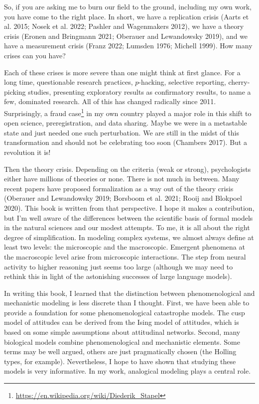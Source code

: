 \documentclass[
  a4paper,
  DIV=11,
  numbers=noendperiod,
  oneside]{scrreprt}
\let\oldmarginnote\marginnote
\renewcommand{\marginnote}[1]{%
\oldmarginnote{\setstretch{0.8}\selectfont#1}%
}
\begin{document}
So, if you are asking me to burn our field to the ground, including my
own work, you have come to the right place. In short, we have a
replication crisis (Aarts et al. 2015; Nosek et al. 2022; Pashler and
Wagenmakers 2012), we have a theory crisis (Eronen and Bringmann 2021;
Oberauer and Lewandowsky 2019), and we have a measurement crisis (Franz
2022; Lumsden 1976; Michell 1999). How many crises can you have?

Each of these crises is more severe than one might think at first
glance. {\marginnote{\begin{footnotesize}We can be most optimistic about
the replication crisis.\end{footnotesize}}} For a long time,
questionable research practices, \(p\)-hacking, selective reporting,
cherry-picking studies, presenting exploratory results as confirmatory
results, to name a few, dominated research. All of this has changed
radically since 2011. Surprisingly, a fraud case\footnote{\url{https://en.wikipedia.org/wiki/Diederik_Stapel}}
in my own country played a major role in this shift to open science,
preregistration, and data sharing. Maybe we were in a metastable state
and just needed one such perturbation. We are still in the midst of this
transformation and should not be celebrating too soon (Chambers 2017).
But a revolution it is!

Then the theory crisis. Depending on the criteria (weak or strong),
psychologists either have millions of theories or none. There is not
much in between. Many recent papers have proposed formalization as a way
out of the theory crisis (Oberauer and Lewandowsky 2019; Borsboom et al.
2021; Rooij and Blokpoel 2020). This book is written from that
perspective. I hope it makes a contribution, but I'm well aware of the
differences between the scientific basis of formal models in the natural
sciences and our modest attempts. To me, it is all about the right
degree of simplification. In modeling complex systems, we almost always
define at least two levels: the microscopic and the macroscopic.
Emergent phenomena at the macroscopic level arise from microscopic
interactions. The step from neural activity to higher reasoning just
seems too large (although we may need to rethink this in light of the
astonishing successes of large language models).

In writing this book, I learned that the distinction between
phenomenological and mechanistic modeling is less discrete than I
thought. First, we have been able to provide a foundation for some
phenomenological catastrophe models. The cusp model of attitudes can be
derived from the Ising model of attitudes, which is based on some simple
assumptions about attitudinal networks. Second, many biological models
combine phenomenological and mechanistic elements. Some terms may be
well argued, others are just pragmatically chosen (the Holling types,
for example). Nevertheless, I hope to have shown that studying these
models is very informative. In my work, analogical modeling plays a
central role.
\end{document}
